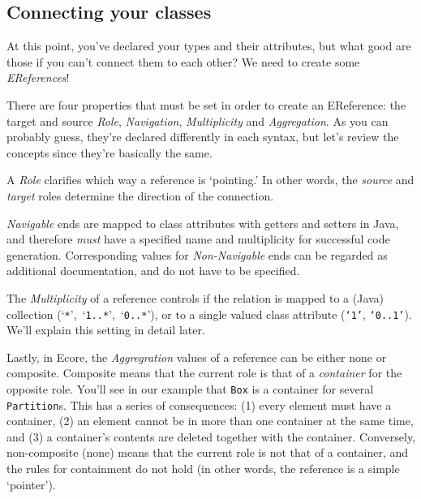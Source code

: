 \newpage
\subsection{Connecting your classes}
\genHeader
\hypertarget{static:references splash}{}

At this point, you've declared your types and their attributes, but what good are those if you can't connect them to each other? We need to create some
\emph{EReferences}!

There are four properties that must be set in order to create an EReference: the target and source \emph{Role}, \emph{Navigation}, \emph{Multiplicity} and
\emph{Aggregation}. As you can probably guess, they're declared differently in each syntax, but let's review the concepts since they're basically the same.

A \emph{Role} clarifies which way a reference is `pointing.' In other words, the \emph{source} and \emph{target} roles determine the direction of the
connection.

\emph{Navigable} ends are mapped to class attributes with getters and setters in Java, and therefore \emph{must} have a specified name and
multiplicity for successful code generation. Corresponding values for \emph{Non-Navigable} ends can  be regarded as additional documentation, and do not have
to be specified.

The \emph{Multiplicity} of a reference controls if the relation is mapped to a (Java) collection (`\texttt{*}',~`\texttt{1..*}',~`\texttt{0..*}'), or to a single
valued class attribute (\texttt{`1'}, \texttt{`0..1'}). We'll explain this setting in detail later.

Lastly, in Ecore, the \emph{Aggregration} values of a reference can be either none or com\-po\-site. Composite means that the current role is that of a
\emph{container} for the opposite role. You'll see in our example that \texttt{Box} is a container for several \texttt{Partition}s.
This has a series of consequences: (1) every element must have a container, (2) an element cannot be in more than one container at the same time, and (3) a
container's contents are deleted together with the container. Conversely, non-composite (none) means that the current role is not that of a container,
and the rules for containment do not hold (in other words, the reference is a simple `pointer').







